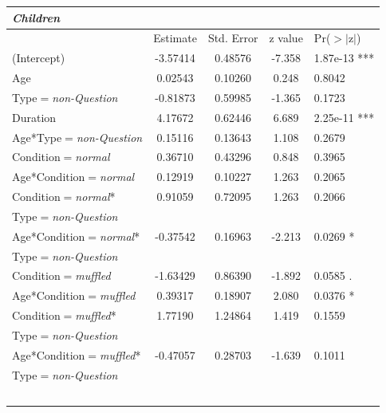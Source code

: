 \documentclass[authoryear, 12pt]{elsarticle}
\begin{document}
\begin{scriptsize}
\begin{longtable}{lcccl}
  \textbf{\textit{Children}} &&&& \\
    \hline
                       & Estimate & Std. Error & z value & Pr($>$$|$z$|$)    \\
    \hline
    (Intercept)                & -3.57414  &   0.48576 &  -7.358 & 1.87e-13 ***    \\
    Age                         & 0.02543 &    0.10260  &  0.248   & 0.8042        \\
    Type$=$\textit{non-Question}                      & -0.81873  &   0.59985 &  -1.365  &  0.1723        \\
    Duration                   &  4.17672  &   0.62446  &  6.689 & 2.25e-11 ***    \\
    Age*Type$=$\textit{non-Question}                &    0.15116   &  0.13643  &  1.108  &  0.2679        \\
	\hline
    Condition$=$\textit{normal}            &  0.36710 &    0.43296 &   0.848  &  0.3965        \\
    Age*Condition$=$\textit{normal}       &   0.12919 &    0.10227  &  1.263  &  0.2065        \\
    Condition$=$\textit{normal}*     &   0.91059  &   0.72095  &  1.263 &   0.2066        \\
    \hspace*{5mm} Type$=$\textit{non-Question} &&&& \\
    Age*Condition$=$\textit{normal}* &   -0.37542  &   0.16963  & -2.213 &   0.0269 *      \\
    \hspace*{5mm} Type$=$\textit{non-Question} &&&& \\
	\hline
    Condition$=$\textit{muffled}         &   -1.63429  &   0.86390 &  -1.892   & 0.0585 .      \\
    Age*Condition$=$\textit{muffled}       &   0.39317 &     0.18907 &   2.080  &  0.0376 *      \\
    Condition$=$\textit{muffled}*     &  1.77190  &   1.24864  &  1.419 &   0.1559        \\
    \hspace*{5mm} Type$=$\textit{non-Question} &&&& \\
    Age*Condition$=$\textit{muffled}* &  -0.47057 &    0.28703 &  -1.639 &   0.1011        \\
    \hspace*{5mm} Type$=$\textit{non-Question} &&&& \\
$$
\end{longtable}
\end{scriptsize}
\end{document}
